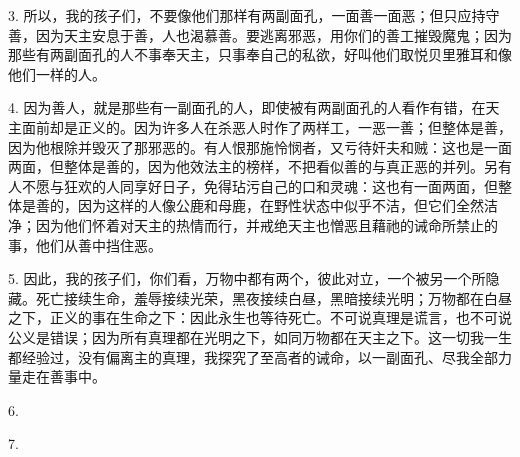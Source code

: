 3. 所以，我的孩子们，不要像他们那样有两副面孔，一面善一面恶；但只应持守善，因为天主安息于善，人也渴慕善。要逃离邪恶，用你们的善工摧毁魔鬼；因为那些有两副面孔的人不事奉天主，只事奉自己的私欲，好叫他们取悦贝里雅耳和像他们一样的人。\par

4. 因为善人，就是那些有一副面孔的人，即使被有两副面孔的人看作有错，在天主面前却是正义的。因为许多人在杀恶人时作了两样工，一恶一善；但整体是善，因为他根除并毁灭了那邪恶的。有人恨那施怜悯者，又亏待奸夫和贼：这也是一面两面，但整体是善的，因为他效法主的榜样，不把看似善的与真正恶的并列。另有人不愿与狂欢的人同享好日子，免得玷污自己的口和灵魂：这也有一面两面，但整体是善的，因为这样的人像公鹿和母鹿，在野性状态中似乎不洁，但它们全然洁净；因为他们怀着对天主的热情而行，并戒绝天主也憎恶且藉祂的诫命所禁止的事，他们从善中挡住恶。\par

5. 因此，我的孩子们，你们看，万物中都有两个，彼此对立，一个被另一个所隐藏。死亡接续生命，羞辱接续光荣，黑夜接续白昼，黑暗接续光明；万物都在白昼之下，正义的事在生命之下：因此永生也等待死亡。不可说真理是谎言，也不可说公义是错误；因为所有真理都在光明之下，如同万物都在天主之下。这一切我一生都经验过，没有偏离主的真理，我探究了至高者的诫命，以一副面孔、尽我全部力量走在善事中。\par

6. \par

7. \par

